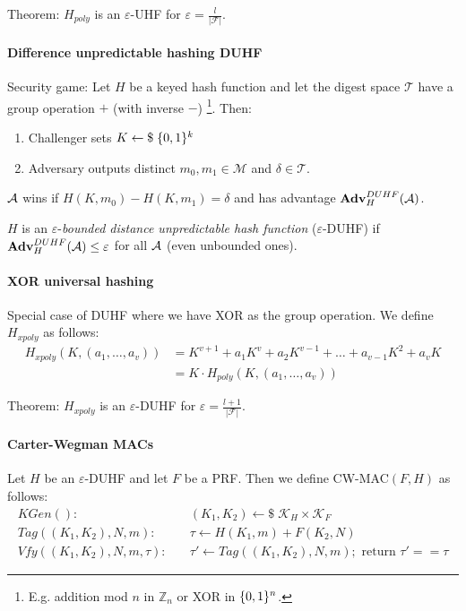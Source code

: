 Theorem:
$H_{poly}$ is an $\varepsilon$-UHF for $\varepsilon = \frac{l}{|\mathcal{F}|}$.

\paragraph{Difference unpredictable hashing DUHF}
Security game:
Let $H$ be a keyed hash function and let the digest space $\mathcal{T}$ have a group operation $+$ (with inverse $-$)%
\footnote{E.g. addition mod $n$ in $\mathbb{Z}_n$ or XOR in $\lbrace 0, 1 \rbrace^n$.}.
Then:
\begin{enumerate}
\item Challenger sets $K \leftarrow \$ \; \lbrace 0, 1 \rbrace^k$
\item Adversary outputs distinct $m_0, m_1 \in \mathcal{M}$ and $\delta \in \mathcal{T}$.
\end{enumerate}
$\mathcal{A}$ wins if $H(K, m_0) - H(K, m_1) = \delta$ and has advantage $\mathbf{Adv}^{DUHF}_{H}(\mathcal{A})$.

$H$ is an $\varepsilon$-\emph{bounded distance unpredictable hash function} ($\varepsilon$-DUHF) if $\mathbf{Adv}^{DUHF}_{H}(\mathcal{A}) \leq \varepsilon$ for all $\mathcal{A}$ (even unbounded ones).

\paragraph{XOR universal hashing}
Special case of DUHF where we have XOR as the group operation.
We define $H_{xpoly}$ as follows:
\begin{align*}
H_{xpoly}(K, (a_1, \dots, a_v))
&= K^{v+1} + a_1 K^v + a_2 K^{v-1} + \dots + a_{v-1} K^2 + a_v K \\
&= K \cdot H_{poly}(K, (a_1, \dots, a_v))
\end{align*}

Theorem:
$H_{xpoly}$ is an $\varepsilon$-DUHF for $\varepsilon = \frac{l+1}{|\mathcal{F}|}$.

\paragraph{Carter-Wegman MACs}
Let $H$ be an $\varepsilon$-DUHF and let $F$ be a PRF.
Then we define CW-MAC$(F, H)$ as follows:
\begin{align*}
KGen():& \quad (K_1, K_2) \leftarrow \$ \; \mathcal{K}_H \times \mathcal{K}_F \\
Tag((K_1, K_2), N, m):& \quad \tau \leftarrow H(K_1, m) + F(K_2, N) \\
Vfy((K_1, K_2), N, m, \tau):& \quad \tau' \leftarrow Tag((K_1, K_2), N, m); \text{ return } \tau' == \tau
\end{align*}

